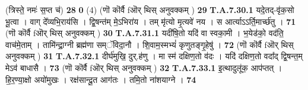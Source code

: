 \documentclass[17pt]{extarticle}
\begin{document}
{                  \newline
                                                        (त्रिस्ते॒ नमः॑ स॒प्त च॑) \textbf{28} \newline \newline
                                \textbf{ } \newline
                   \textbf{ 0} \newline
                  \newline
                                                        (4) (णॊ कॊर्वै fऒर् थिस् अनुवक्कम् ) \textbf{29} \newline \newline
                                \textbf{ T.A.7.30.1} \newline
                  यदे॒तद्-वृ॑क॒सो भू॒त्वा । वाग् दे᳚व्यभि॒राय॑सि । द्वि॒षन्त॑म् मे॒ऽभिरा॑य । तम् मृ॑त्यो मृ॒त्यवे॑ नय । स आर्त्याऽऽर्ति॒मार्च्छ॑तु । \textbf{ 71} \newline
                  \newline
                                                        (णॊ कॊर्वै fऒर् थिस् अनुवक्कम् ) \textbf{30} \newline \newline
                                \textbf{ T.A.7.31.1} \newline
                  यदी॑षि॒तो यदि॑ वा स्वका॒मी । भ॒येड॑को॒ वद॑ति॒ वाच॑मे॒ताम् । तामि॑न्द्रा॒ग्नी ब्रह्म॑णा सम्ॅविदा॒नौ ।  शि॒वाम॒स्मभ्यं॑ कृणुतङ्गृ॒हेषु॑ । \textbf{ 72} \newline
                  \newline
                                                        (णॊ कॊर्वै fऒर् थिस् अनुवक्कम् ) \textbf{31} \newline \newline
                                \textbf{ T.A.7.32.1} \newline
                  दीर्घ॑मुखि॒ दुर्.ह॑णु । मा स्म॑ दक्षिण॒तो व॑दः ।  यदि॑ दक्षिण॒तो वदा᳚द् द्वि॒षन्त॒म् मेऽव॑ बाधासै । \textbf{ 73} \newline
                  \newline
                                                        (णॊ कॊर्वै fऒर् थिस् अनुवक्कम् ) \textbf{32} \newline \newline
                                \textbf{ T.A.7.33.1} \newline
                  इ॒त्थादुलू॑क॒ आप॑प्तत् । हि॒र॒ण्या॒क्षो अयो॑मुखः ।  रक्ष॑सान्दू॒त आग॑तः । तमि॒तो ना॑शयाग्ने । \textbf{ 74} \newline
}
\end{document}
